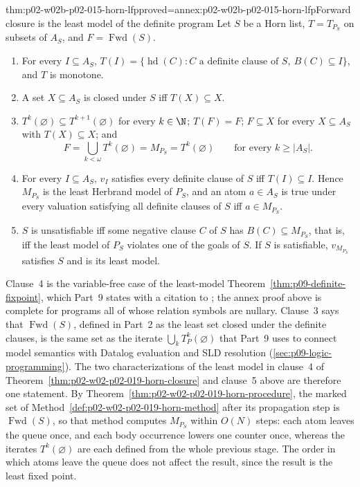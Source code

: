 \begin{hbtheorem}{thm:p02-w02b-p02-015-horn-lfp}{proved=annex:p02-w02b-p02-015-horn-lfp}{Forward closure is the least model of the definite program}
Let \(S\) be a Horn list, \(T=T_{P_S}\) on subsets of \(A_S\), and
\(F=\operatorname{Fwd}(S)\).
\begin{enumerate}
  \item For every \(I\subseteq A_S\),
        \(T(I)=\{\operatorname{hd}(C): C\text{ a definite clause of }S,\
        B(C)\subseteq I\}\), and \(T\) is monotone.
  \item A set \(X\subseteq A_S\) is closed under \(S\) iff
        \(T(X)\subseteq X\).
  \item \(T^k(\varnothing)\subseteq T^{k+1}(\varnothing)\) for every
        \(k\in\N\); \(T(F)=F\); \(F\subseteq X\) for every \(X\subseteq A_S\)
        with \(T(X)\subseteq X\); and
        \[
         F=\bigcup_{k<\omega}T^k(\varnothing)=M_{P_S}=T^k(\varnothing)
         \qquad\text{for every }k\geq|A_S|.
        \]
  \item For every \(I\subseteq A_S\), \(v_I\) satisfies every definite clause
        of \(S\) iff \(T(I)\subseteq I\).  Hence \(M_{P_S}\) is the least
        Herbrand model of \(P_S\), and an atom \(a\in A_S\) is true under every
        valuation satisfying all definite clauses of \(S\) iff
        \(a\in M_{P_S}\).
  \item \(S\) is unsatisfiable iff some negative clause \(C\) of \(S\) has
        \(B(C)\subseteq M_{P_S}\), that is, iff the least model of \(P_S\)
        violates one of the goals of \(S\).  If \(S\) is satisfiable,
        \(v_{M_{P_S}}\) satisfies \(S\) and is its least model.
\end{enumerate}
\end{hbtheorem}

Clause~4 is the variable-free case of the least-model
Theorem~\ref{thm:p09-definite-fixpoint}, which Part~9 states with a citation
to \textcite{VanEmdenKowalski1976}; the annex proof above is complete for
programs all of whose relation symbols are nullary.  Clause~3 says that
\(\operatorname{Fwd}(S)\), defined in Part~2 as the least set closed under
the definite clauses, is the same set as the iterate
\(\bigcup_kT_P^k(\varnothing)\) that Part~9 uses to connect model semantics
with Datalog evaluation and SLD resolution
(\cref{sec:p09-logic-programming}).  The two characterizations of the least
model in clause~4 of Theorem~\ref{thm:p02-w02-p02-019-horn-closure} and
clause~5 above are therefore one statement.  By
Theorem~\ref{thm:p02-w02-p02-019-horn-procedure}, the marked set of
Method~\ref{def:p02-w02-p02-019-horn-method} after its propagation step is
\(\operatorname{Fwd}(S)\), so that method computes \(M_{P_S}\) within
\(O(N)\) steps: each atom leaves the queue once, and each body occurrence
lowers one counter once, whereas the iterates \(T^k(\varnothing)\) are each
defined from the whole previous stage.  The order in which atoms leave the
queue does not affect the result, since the result is the least fixed point.

